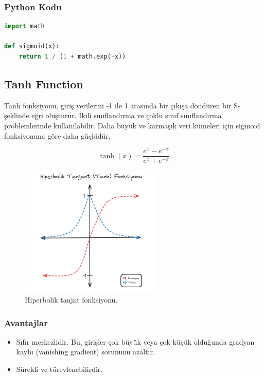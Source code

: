 \subsubsection{Python Kodu}

\begin{lstlisting}[language=Python]
import math

def sigmoid(x):
    return 1 / (1 + math.exp(-x))
\end{lstlisting}

\newpage

\subsection{Tanh Function}
Tanh fonksiyonu, giriş verilerini -1 ile 1 arasında bir çıkışa döndüren bir S-şeklinde eğri oluşturur. İkili sınıflandırma ve çoklu sınıf sınıflandırma problemlerinde kullanılabilir. Daha büyük ve karmaşık veri kümeleri için sigmoid fonksiyonuna göre daha güçlüdür.

\[\tanh(x) = \frac{e^{x} - e^{-x}}{e^{x} + e^{-x}}\]

\begin{figure}[h]
    \centering
    \includegraphics[width=0.6\textwidth]{images/tanh_function.png}
    \caption{Hiperbolik tanjnt fonksiyonu.}
    \label{fig:enter-label}
\end{figure}

\subsubsection{Avantajlar}
\begin{itemize}
    \item Sıfır merkezlidir. Bu, girişler çok büyük veya çok küçük olduğunda gradyan kaybı (vanishing gradient) sorununu azaltır.
    \item Sürekli ve türevlenebilirdir.
\end{itemize}

